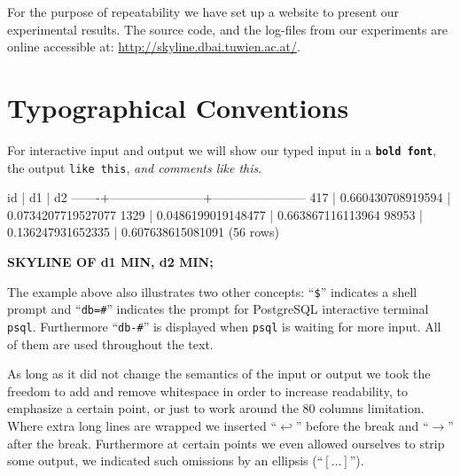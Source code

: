 For the purpose of repeatability we have set up a website to present
our experimental results. The source code, and the log-files from our
experiments are online accessible at:
\url{http://skyline.dbai.tuwien.ac.at/}.


\section{Typographical Conventions}
For interactive input and output we will show our typed input in a \texttt{\bfseries bold font}, the output \texttt{like this}, \textit{and comments like this}.



\begin{interactive}
  id   |          d1           |          d2
-------+-----------------------+-----------------------
   417 |     0.660430708919594 |    0.0734207719527077
  1329 |    0.0486199019148477 |     0.663867116113964
\ellipsis{}
 98953 |     0.136247931652335 |     0.607638615081091
(56 rows)

 \prebreak {}
   \postbreak \textbf{SKYLINE OF d1 MIN, d2 MIN;}
\ellipsis{}

\shprompt{}
\end{interactive}

The example above also illustrates two other concepts: ``\texttt{\$}''
indicates a shell prompt and ``\texttt{db=\#}'' indicates the prompt
for PostgreSQL interactive terminal \texttt{psql}. Furthermore
``\texttt{db-\#}'' is displayed when \texttt{psql} is waiting for more
input. All of them are used throughout the text.

As long as it did not change the semantics of the input or output we
took the freedom to add and remove whitespace in order to increase
readability, to emphasize a certain point, or just to work around the
80 columns limitation.  Where extra long lines are wrapped we inserted
``$\hookleftarrow$'' before the break and ``$\rightarrow$'' after the break.
Furthermore at certain points we even allowed ourselves to strip some
output, we indicated such omissions by an ellipsis (``$[\ldots]$'').

